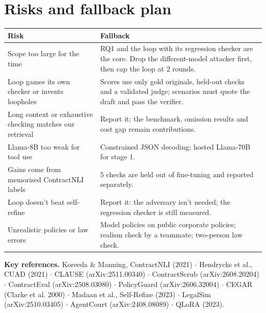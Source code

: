 \documentclass[11pt,a4paper]{article}
\begin{document}
\section{Risks and fallback plan}
\begin{table}[H]\footnotesize
\begin{tabularx}{\textwidth}{@{}LL@{}}
\toprule
\textbf{Risk} & \textbf{Fallback} \\
\midrule
Scope too large for the time & RQ1 and the loop with its regression checker are the core. Drop the different-model attacker first, then cap the loop at 2 rounds. \\
Loop games its own checker or invents loopholes & Scores use only gold originals, held-out checks and a validated judge; scenarios must quote the draft and pass the verifier. \\
Long context or exhaustive checking matches our retrieval & Report it; the benchmark, omission results and cost gap remain contributions. \\
Llama-8B too weak for tool use & Constrained JSON decoding; hosted Llama-70B for stage 1. \\
Gains come from memorised ContractNLI labels & 5 checks are held out of fine-tuning and reported separately. \\
Loop doesn't beat self-refine & Report it: the adversary isn't needed; the regression checker is still measured. \\
Unrealistic policies or law errors & Model policies on public corporate policies; realism check by a teammate; two-person law check. \\
\bottomrule
\end{tabularx}
\end{table}

\vspace{-8pt}
{\scriptsize\textbf{Key references.} Koreeda \& Manning, ContractNLI (2021) $\cdot$ Hendrycks et al., CUAD (2021) $\cdot$ CLAUSE (arXiv:2511.00340) $\cdot$ ContractScrub (arXiv:2608.20204) $\cdot$ ContractEval (arXiv:2508.03080) $\cdot$ PolicyGuard (arXiv:2606.32004) $\cdot$ CEGAR (Clarke et al. 2000) $\cdot$ Madaan et al., Self-Refine (2023) $\cdot$ LegalSim (arXiv:2510.03405) $\cdot$ AgentCourt (arXiv:2408.08089) $\cdot$ QLoRA (2023).}
\end{document}
